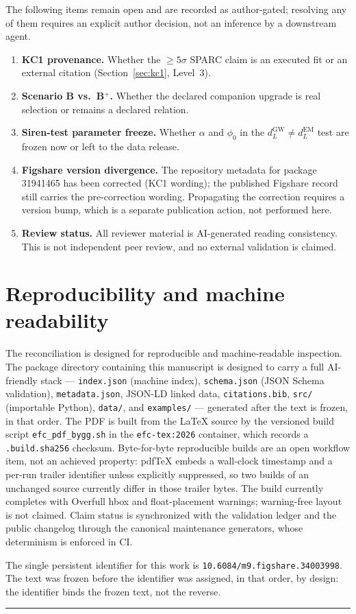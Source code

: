 \documentclass[11pt,a4paper]{article}
\newcommand{\paperdoi}{10.6084/m9.figshare.34003998}
\begin{document}
The following items remain open and are recorded as author-gated; resolving any of them requires an explicit author decision, not an inference by a downstream agent.

\begin{enumerate}
\item \textbf{KC1 provenance.} Whether the $\ge 5\sigma$ SPARC claim is an executed fit or an external citation (Section~\ref{sec:kc1}, Level~3).
\item \textbf{Scenario B vs.\ B$^{+}$.} Whether the declared companion upgrade is real selection or remains a declared relation.
\item \textbf{Siren-test parameter freeze.} Whether $\alpha$ and $\phi_{0}$ in the $d_{L}^{\mathrm{GW}} \neq d_{L}^{\mathrm{EM}}$ test are frozen now or left to the data release.
\item \textbf{Figshare version divergence.} The repository metadata for package 31941465 has been corrected (KC1 wording); the published Figshare record still carries the pre-correction wording. Propagating the correction requires a version bump, which is a separate publication action, not performed here.
\item \textbf{Review status.} All reviewer material is AI-generated reading consistency. This is not independent peer review, and no external validation is claimed.
\end{enumerate}

\section{Reproducibility and machine readability}

The reconciliation is designed for reproducible and machine-readable inspection. The package directory containing this manuscript is designed to carry a full AI-friendly stack --- \texttt{index.json} (machine index), \texttt{schema.json} (JSON Schema validation), \texttt{metadata.json}, JSON-LD linked data, \texttt{citations.bib}, \texttt{src/} (importable Python), \texttt{data/}, and \texttt{examples/} --- generated after the text is frozen, in that order. The PDF is built from the \LaTeX{} source by the versioned build script \texttt{efc\_pdf\_bygg.sh} in the \texttt{efc-tex:2026} container, which records a \texttt{.build.sha256} checksum. Byte-for-byte reproducible builds are an open workflow item, not an achieved property: pdfTeX embeds a wall-clock timestamp and a per-run trailer identifier unless explicitly suppressed, so two builds of an unchanged source currently differ in those trailer bytes. The build currently completes with Overfull hbox and float-placement warnings; warning-free layout is not claimed. Claim status is synchronized with the validation ledger and the public changelog through the canonical maintenance generators, whose determinism is enforced in CI.

The single persistent identifier for this work is \texttt{\paperdoi}. The text was frozen before the identifier was assigned, in that order, by design: the identifier binds the frozen text, not the reverse.

\vspace{1em}
\color{rulegray}\hrule\color{black}
\end{document}

